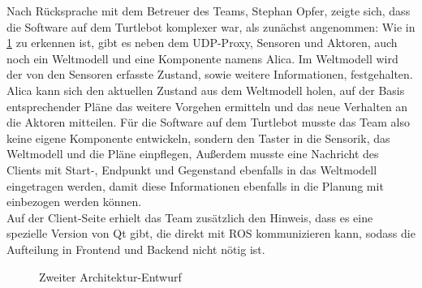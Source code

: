 \documentclass[a4paper,12pt,headsepline]{scrartcl}
\begin{document}
		Nach Rücksprache mit dem Betreuer des Teams, Stephan Opfer, zeigte sich, dass die Software auf dem Turtlebot komplexer war, als zunächst angenommen: Wie in \cref{fig:arch02} zu erkennen ist, gibt es neben dem UDP-Proxy, Sensoren und Aktoren, auch noch ein Weltmodell und eine Komponente namens \glqq Alica\grqq . Im Weltmodell wird der von den Sensoren erfasste Zustand, sowie weitere Informationen, festgehalten. Alica kann sich den aktuellen Zustand aus dem Weltmodell holen, auf der Basis entsprechender Pläne das weitere Vorgehen ermitteln und das neue Verhalten an die Aktoren mitteilen. Für die Software auf dem Turtlebot musste das Team also keine eigene Komponente entwickeln, sondern den Taster in die Sensorik, das Weltmodell und die Pläne einpflegen, Außerdem musste eine Nachricht des Clients mit Start-, Endpunkt und Gegenstand ebenfalls in das Weltmodell eingetragen werden, damit diese Informationen ebenfalls in die Planung mit einbezogen werden können. \\
		Auf der Client-Seite erhielt das Team zusätzlich den Hinweis, dass es eine spezielle Version von Qt gibt, die direkt mit ROS kommunizieren kann, sodass die Aufteilung in Frontend und Backend nicht nötig ist.
		\begin{figure}[H]
			\centering
			\resizebox{\textwidth}{!}{}
			\caption{Zweiter Architektur-Entwurf}
			\label{fig:arch02}
		\end{figure}
		
\end{document}
